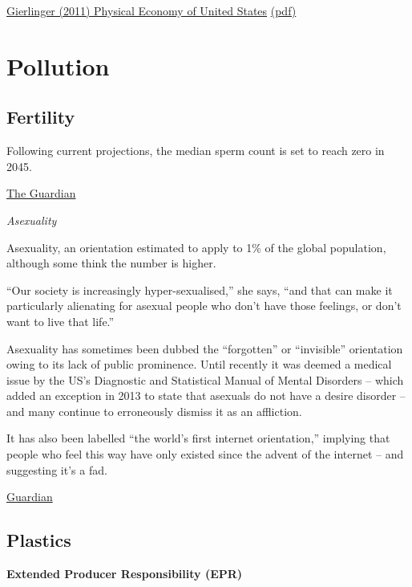 \documentclass[
]{book}
\begin{document}
\href{https://onlinelibrary.wiley.com/doi/full/10.1111/j.1530-9290.2011.00404.x}{Gierlinger (2011) Physical Economy of United States}
\href{pdf/Gierlinger_2011_Physical_Economy_of_US.pdf}{(pdf)}

\hypertarget{pollution}{%
\chapter{Pollution}\label{pollution}}

\hypertarget{fertility}{%
\section{Fertility}\label{fertility}}

Following current projections, the median sperm count is set to reach zero in 2045.

\href{https://www.theguardian.com/us-news/2021/feb/26/falling-sperm-counts-human-survival}{The Guardian}

\emph{Asexuality}

Asexuality, an orientation estimated to apply to 1\% of the global population,
although some think the number is higher.

``Our society is increasingly hyper-sexualised,'' she says, ``and that can make it particularly alienating for asexual people who don't have those feelings, or don't want to live that life.''

Asexuality has sometimes been dubbed the ``forgotten'' or ``invisible'' orientation owing to its lack of public prominence. Until recently it was deemed a medical issue by the US's Diagnostic and Statistical Manual of Mental Disorders -- which added an exception in 2013 to state that asexuals do not have a desire disorder -- and many continue to erroneously dismiss it as an affliction.

It has also been labelled ``the world's first internet orientation,'' implying that people who feel this way have only existed since the advent of the internet -- and suggesting it's a fad.

\href{https://www.theguardian.com/lifeandstyle/2021/mar/21/i-dont-want-sex-with-anyone-the-growing-asexuality-movement}{Guardian}

\hypertarget{plastics}{%
\section{Plastics}\label{plastics}}

\textbf{Extended Producer Responsibility (EPR)}
\end{document}
